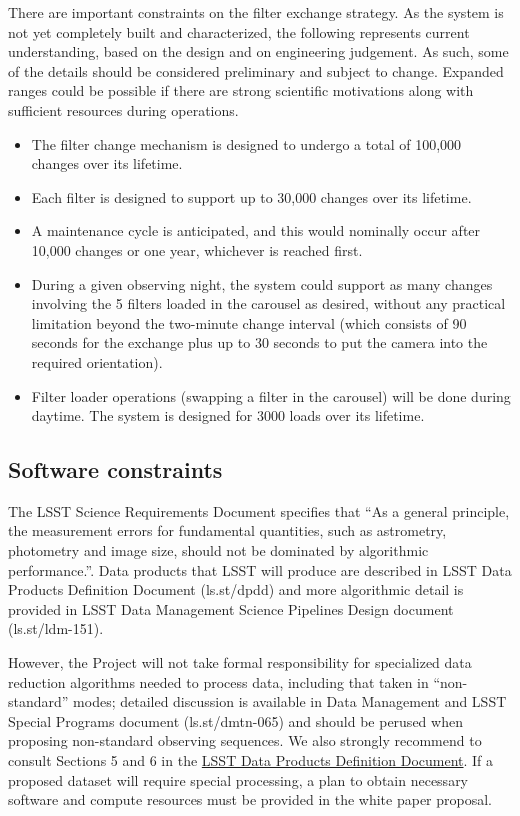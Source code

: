 \documentclass[DM,lsstdraft,toc,usenatbib]{lsstdoc}
\begin{document}
There are important constraints on the filter exchange strategy. As the system is not yet completely 
built and characterized, the following represents current understanding, based on the design and on 
engineering judgement. As such, some of the details should be considered preliminary and subject 
to change. Expanded ranges could be possible if there are strong scientific motivations along with
sufficient resources during operations.
\begin{itemize}
\item The filter change mechanism is designed to undergo a total of 100,000 changes over its lifetime. 
\item Each filter is designed to support up to 30,000 changes over its lifetime.
\item A maintenance cycle is anticipated, and this would nominally occur after 10,000 changes or 
          one year, whichever is reached first. 
\item During a given observing night, the system could support as many changes involving the 5 filters 
          loaded in the carousel as desired, without any practical limitation beyond the two-minute change 
          interval (which consists of 90 seconds for the exchange plus up to 30 seconds to put the camera
          into the required orientation). 
\item Filter loader operations (swapping a filter in the carousel) will be done during daytime. The system 
          is designed for 3000 loads over its lifetime. 
\end{itemize} 


\subsection{Software constraints} 

The LSST Science Requirements Document specifies that ``As a general principle, the measurement errors
for fundamental quantities, such as astrometry, photometry and image size, should not be dominated by 
algorithmic performance.''. Data products that LSST will produce are described in LSST Data Products
Definition Document (ls.st/dpdd) and more algorithmic detail is provided in LSST Data Management 
Science Pipelines Design document (ls.st/ldm-151). 

However, the Project will not take formal responsibility for specialized data reduction algorithms 
needed to process data, including that taken in ``non-standard'' modes; detailed discussion is 
available in Data Management and LSST Special Programs document (ls.st/dmtn-065) and should
be perused when proposing non-standard observing sequences. We also strongly recommend to 
consult Sections 5 and 6 in the \href{http://ls.st/dpdd}{LSST Data Products Definition Document}. If a proposed dataset will 
require special processing, a plan to obtain necessary software and compute resources must be 
provided in the white paper proposal.
\end{document}
